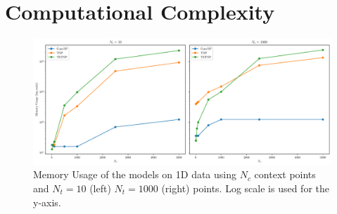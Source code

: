 \documentclass[../../main.tex]{subfiles}
\begin{document}
\section{Computational Complexity}



\begin{figure}[H]
	\centering
	\includegraphics[width=0.97\linewidth]{./runtime1d.pdf}
	\caption{Memory Usage of the models on 1D data using $N_c$ context points and $N_t = 10$ (left) $N_t = 1000$ (right) points. Log scale is used for the y-axis.}
	\label{tab:memory-usage-comparison}
\end{figure}
\end{document}
